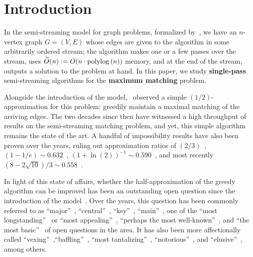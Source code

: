 
\newcommand{\bLstar}{\bL^{\star}}
\newcommand{\bRstar}{\bR^{\star}}


\section{Introduction}\label{sec:intro} 

In the semi-streaming model for graph problems, formalized by~\cite{FeigenbaumKMSZ05}, we have an $n$-vertex graph $G=(V,E)$ whose edges are given
to the algorithm in some arbitrarily ordered stream; the algorithm makes one or a few passes over the stream, uses $\widetilde{O}(n):= O(n \cdot \mbox{\rm poly}\!\log{(n)})$ memory, and at the end of the stream, 
outputs a solution to the problem at hand. In this paper, we study \textbf{single-pass} semi-streaming algorithms for the \textbf{maximum matching} problem. 

Alongside the introduction of the model,~\cite{FeigenbaumKMSZ05} observed a simple $(1/2)$-approximation for this problem: greedily maintain a maximal matching of the arriving edges. 
The two decades since then have witnessed a high throughput of results on the semi-streaming matching problem, and yet, this simple algorithm remains the state of the art. A handful of 
impossibility results have also been proven over the years, ruling out approximation ratios of $(2/3)$~\cite{GoelKK12}, $(1-1/e) \sim 0.632$~\cite{Kapralov13}, $(1+\ln{(2)})^{-1} \sim 0.590$~\cite{Kapralov21}, 
and most recently $(8-2\sqrt{10})/3 \sim 0.558$~\cite{AssadiJX26}. 

In light of this state of affairs, whether the half-approximation of the greedy algorithm can be improved has been an outstanding open question since the introduction of the model~\cite{FeigenbaumKMSZ05,KonradMM12,sublinear_open_60,McGregor14,KaleT17,KonradN21}. 
Over the years, this question has been commonly referred to as ``major''~\cite{Tirodkar18,GamlathKMS19,GargKRS20,FischerMU22}, ``central''~\cite{AssadiBKL23,DerakhshanGR25}, ``key''~\cite{AlexandruDKN23}, ``main''~\cite{Bernstein24}, one of the ``most longstanding''~\cite{Behnezhad21,AssadiB21,DerakhshanGR25} or ``most appealing''~\cite{EsfandiariHM16,CormodeJMM17}, ``perhaps the most well-known''~\cite{Gamlath21}, and ``the most basic''~\cite{FeldmanS22} of open questions in the area. It has also been more affectionally called ``vexing''~\cite{ChakrabartiK14},``baffling''~\cite{KaleT17}, ``most tantalizing''~\cite{Wajc21}, ``notorious''~\cite{FeldmanNSZ22}, and ``elusive''~\cite{naidu2024streaming}, among others.  


